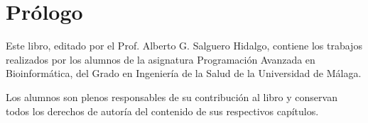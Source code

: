 \documentclass{book}
\begin{document}
	\newpage
	
	\chapter*{Prólogo}
	
	Este libro, editado por el Prof. Alberto G. Salguero Hidalgo, contiene los trabajos realizados por los alumnos de la asignatura Programación Avanzada en Bioinformática, del Grado en Ingeniería de la Salud de la Universidad de Málaga. 
	
	Los alumnos son plenos responsables de su contribución al libro y conservan todos los derechos de autoría del contenido de sus respectivos capítulos.
	
	\newpage
	
	\tableofcontents
	\thispagestyle{empty} %
	
	\newpage
	
	
	

	
\end{document}

